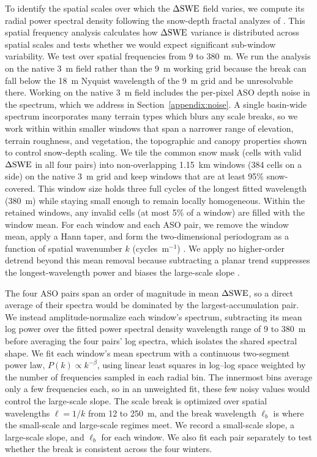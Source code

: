 \documentclass[journal abbreviation, manuscript]{copernicus}
\begin{document}
To identify the spatial scales over which the $\Delta\mathrm{SWE}$ field varies, we compute its radial power spectral density following the snow-depth fractal analyzes of \citet{trujillo2007topographic-0ec}. This spatial frequency analysis calculates how $\Delta\mathrm{SWE}$ variance is distributed across spatial scales and tests whether we would expect significant sub-window variability. We test over spatial frequencies from 9 to 380~m. We run the analysis on the native 3~m field rather than the 9~m working grid because the break can fall below the 18~m Nyquist wavelength of the 9~m grid and be unresolvable there.  Working on the native 3~m field includes the per-pixel ASO depth noise in the spectrum, which we address in Section~\ref{appendix:noise}. A single basin-wide spectrum incorporates many terrain types which blurs any scale breaks, so we work within within smaller windows that span a narrower range of elevation, terrain roughness, and vegetation, the topographic and canopy properties shown to control snow-depth scaling. We tile the common snow mask (cells with valid $\Delta\mathrm{SWE}$ in all four pairs) into non-overlapping 1.15~km windows (384 cells on a side) on the native 3~m grid and keep windows that are at least 95\% snow-covered. This window size holds three full cycles of the longest fitted wavelength (380~m) while staying small enough to remain locally homogeneous. Within the retained windows, any invalid cells (at most 5\% of a window) are filled with the window mean. For each window and each ASO pair, we remove the window mean, apply a Hann taper, and form the two-dimensional periodogram as a function of spatial wavenumber $k$ (cycles~m$^{-1}$) \citep{harris1978windows}. We apply no higher-order detrend beyond this mean removal because subtracting a planar trend suppresses the longest-wavelength power and biases the large-scale slope \citep{deems2006}.

The four ASO pairs span an order of magnitude in mean $\Delta\mathrm{SWE}$, so a direct average of their spectra would be dominated by the largest-accumulation pair. We instead amplitude-normalize each window's spectrum, subtracting its mean log power over the fitted power spectral density wavelength range of 9 to 380~m before averaging the four pairs' log spectra, which isolates the shared spectral shape. We fit each window's mean spectrum with a continuous two-segment power law, $P(k)\propto k^{-\beta}$, using linear least squares in log--log space weighted by the number of frequencies sampled in each radial bin. The innermost bins average only a few frequencies each, so in an unweighted fit, these few noisy values would control the large-scale slope. The scale break is optimized over spatial wavelengths $\ell=1/k$ from 12 to 250~m, and the break wavelength $\ell_b$ is where the small-scale and large-scale regimes meet. We record a small-scale slope, a large-scale slope, and $\ell_b$ for each window. We also fit each pair separately to test whether the break is consistent across the four winters.
\end{document}
